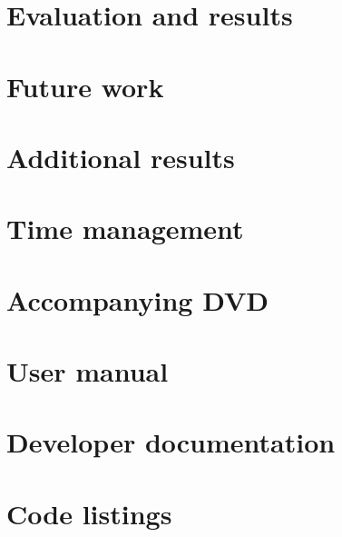\documentclass[a4paper,12pt]{report}
\begin{document}
\chapter{Evaluation and results}

\clearpage
\clearpage


\chapter{Future work}



\newpage


\newpage
\appendix

\chapter{Additional results}


\chapter{Time management}


\chapter{Accompanying DVD}


\chapter{User manual}


\chapter{Developer documentation}


\chapter{Code listings}

\end{document}
